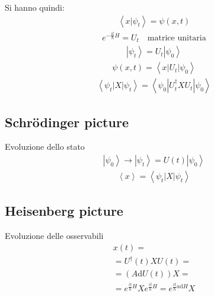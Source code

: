 Si hanno quindi:
\begin{equation}\begin{split}
\left\langle x|\psi _t \right\rangle=\psi \left(x,t\right)
\end{split}\end{equation}
\begin{equation}\begin{split}
e^{-\frac{it}{\hbar }H}=U_t \quad \textrm{matrice unitaria}
\end{split}\end{equation}
\begin{equation}\begin{split}
\left |\psi _t \right\rangle=U_t\left |\psi _0 \right\rangle
\end{split}\end{equation}
\begin{equation}\begin{split}
\psi \left(x,t\right)=\left\langle x|U_t|\psi _0 \right\rangle
\end{split}\end{equation}
\begin{equation}\begin{split}
\left\langle \psi _t|X|\psi _t \right\rangle=\left\langle \psi _0|U_t^\dag XU_t|\psi _0 \right\rangle
\end{split}\end{equation}

\subsection{Schrödinger picture} %
Evoluzione dello stato
\begin{equation}\begin{split}
\left |\psi _0 \right\rangle \rightarrow \left |\psi _t \right\rangle=U\left(t\right)\left |\psi _0 \right\rangle
\end{split}\end{equation}
\begin{equation}\begin{split}
\left\langle x \right\rangle=\left\langle \psi _t|X|\psi _t \right\rangle
\end{split}\end{equation}

\subsection{Heisenberg picture} %
Evoluzione delle osservabili
\begin{equation}\begin{split}
x\left(t\right)=\\
=U^\dag\left(t\right) XU\left(t\right)=\\
=\left(A\textrm{d}U\left(t\right)\right)X=\\
=e^{\frac{it}{\hbar }H}Xe^{\frac{it}{\hbar }H}=e^{\frac{it}{\hbar }a\textrm{d}H}X
\end{split}\end{equation}

